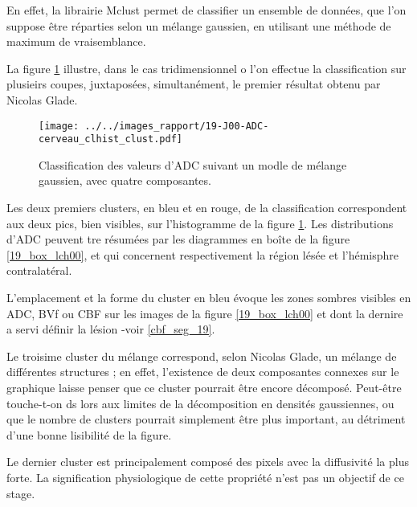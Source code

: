 \par
En effet, la librairie Mclust permet de classifier un ensemble de donn\'ees, que l'on suppose \^etre r\'eparties selon un m\'elange gaussien, %
en utilisant une m\'ethode de maximum de vraisemblance.

\par
La figure \ref{exem_ADC_19} illustre, dans le cas tridimensionnel o l'on effectue la classification sur plusieirs coupes, juxtapos\'ees, simultan\'ement, %
le premier r\'esultat obtenu par Nicolas Glade.

\begin{figure}[H]
\texttt{[image: ../../images\_rapport/19-J00-ADC-cerveau\_clhist\_clust.pdf]}
\caption{Classification des valeurs d'ADC suivant un modle de m\'elange gaussien, avec quatre composantes.
%
}
\label{exem_ADC_19}
\end{figure}

\par
Les deux premiers clusters, en bleu et en rouge, de la classification correspondent aux deux pics, bien visibles, sur l'histogramme de la figure \ref{exem_ADC_19}. %
Les distributions d'ADC peuvent tre r\'esum\'ees par les diagrammes en bo\^ite de la figure \ref{19_box_lch00}, %
et qui concernent respectivement la r\'egion l\'es\'ee et l'h\'emisphre contralat\'eral.

\par
L'emplacement et la forme du cluster en bleu \'evoque les zones sombres visibles en ADC, BVf ou CBF sur les images de la figure \ref{19_box_lch00} %
et dont la dernire a servi  d\'efinir la l\'esion -voir \ref{cbf_seg_19}.

\par
Le troisime cluster du m\'elange correspond, selon Nicolas Glade,  un m\'elange de diff\'erentes structures ; %
en effet, l'existence de deux composantes connexes sur le graphique laisse penser que ce cluster pourrait \^etre encore d\'ecompos\'e. %
Peut-\^etre touche-t-on ds lors aux limites de la d\'ecomposition en densit\'es gaussiennes, ou que le nombre de clusters pourrait simplement \^etre plus important, %
au d\'etriment d'une bonne lisibilit\'e de la figure.

\par
Le dernier cluster est principalement compos\'e des pixels avec la diffusivit\'e la plus forte. %
La signification physiologique de cette propri\'et\'e n'est pas un objectif de ce stage.

